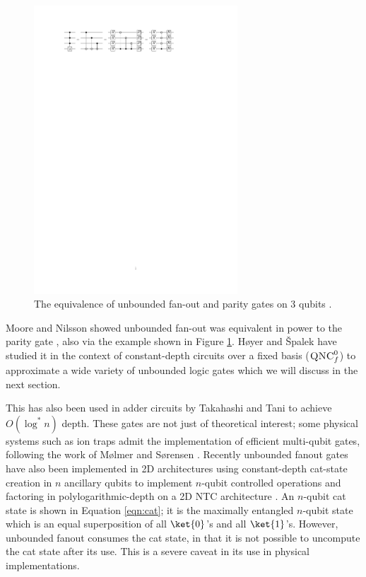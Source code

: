 \begin{figure}
\begin{center}
\includegraphics[width=3in]{figures/fanout.pdf}
\caption{The equivalence of unbounded fan-out and parity gates on 3 qubits \cite{Hoyer2002}.}
\label{fig:fanout}
\end{center}
\end{figure}

Moore and Nilsson showed unbounded fan-out was equivalent in power to the parity gate
\cite{Moore1998}, also via the example shown in Figure \ref{fig:fanout}.
H{\o}yer and {\v S}palek have studied it in the
context of constant-depth circuits over a fixed basis ($\textsc{QNC}_f^0$)
to approximate a wide variety of unbounded logic gates \cite{Hoyer2002} which
we will discuss in the next section.

This has also been used in adder circuits by Takahashi and Tani
\cite{Takahashi2009} to achieve $O(\log^* n)$ depth.
These gates are not just of theoretical interest; some physical systems
such as ion traps admit the implementation of efficient multi-qubit gates,
following the work of M{\o}lmer and S{\o}rensen \cite{Sorensen1999}.
Recently unbounded fanout gates have also been implemented in 2D architectures using
constant-depth cat-state creation in $n$ ancillary qubits to
implement $n$-qubit controlled operations \cite{Rosenbaum2012} and
factoring in polylogarithmic-depth on a \textsc{2D NTC} architecture
\cite{Pham2012b}.
An $n$-qubit cat state is shown in Equation \ref{eqn:cat}; it is the
maximally entangled $n$-qubit state which is an equal superposition of all
$\ket{0}$'s and all $\ket{1}$'s.
However, unbounded fanout consumes the cat state,
in that it is not possible to uncompute the cat state after its use. This is
a severe caveat in its use in physical implementations.

